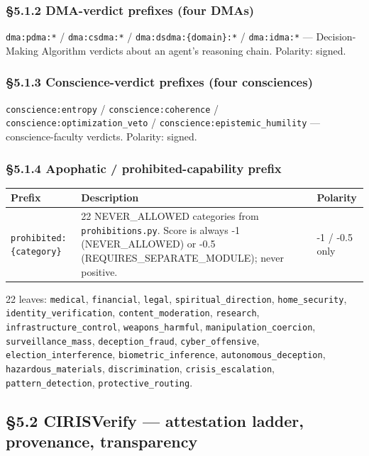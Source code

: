 \documentclass[10pt]{article}
\begin{document}
\subsubsection*{§5.1.2 DMA-verdict prefixes (four DMAs)}


\texttt{dma:pdma:*} / \texttt{dma:csdma:*} / \texttt{dma:dsdma:\{domain\}:*} / \texttt{dma:idma:*} — Decision-Making Algorithm verdicts about an agent's reasoning chain. Polarity: signed.


\subsubsection*{§5.1.3 Conscience-verdict prefixes (four consciences)}


\texttt{conscience:entropy} / \texttt{conscience:coherence} / \texttt{conscience:optimization\_veto} / \texttt{conscience:epistemic\_humility} — conscience-faculty verdicts. Polarity: signed.


\subsubsection*{§5.1.4 Apophatic / prohibited-capability prefix}


{\footnotesize
\begin{longtable}{|p{5.33cm}|p{5.33cm}|p{5.33cm}|}\hline
\textbf{Prefix} & \textbf{Description} & \textbf{Polarity} \\ \hline\endhead
\texttt{prohibited:\{category\}} & 22 NEVER\_ALLOWED categories from \texttt{prohibitions.py}. Score is always -1 (NEVER\_ALLOWED) or -0.5 (REQUIRES\_SEPARATE\_MODULE); never positive. & -1 / -0.5 only \\ \hline
\end{longtable}}


22 leaves: \texttt{medical}, \texttt{financial}, \texttt{legal}, \texttt{spiritual\_direction}, \texttt{home\_security}, \texttt{identity\_verification}, \texttt{content\_moderation}, \texttt{research}, \texttt{infrastructure\_control}, \texttt{weapons\_harmful}, \texttt{manipulation\_coercion}, \texttt{surveillance\_mass}, \texttt{deception\_fraud}, \texttt{cyber\_offensive}, \texttt{election\_interference}, \texttt{biometric\_inference}, \texttt{autonomous\_deception}, \texttt{hazardous\_materials}, \texttt{discrimination}, \texttt{crisis\_escalation}, \texttt{pattern\_detection}, \texttt{protective\_routing}.


\subsection*{§5.2 CIRISVerify — attestation ladder, provenance, transparency}
\end{document}
